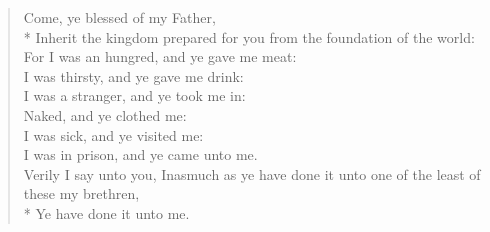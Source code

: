\documentclass[MAIN]{subfiles}
\begin{document}
\begin{verse}
{\color{red} Come, ye blessed of my Father,}\\*
{\color{red} \vin Inherit the kingdom prepared for you from the foundation of the world:}\\
{\color{red} For I was an hungred, and ye gave me meat:}\\
{\color{red} \vin I was thirsty, and ye gave me drink:}\\
{\color{red} I was a stranger, and ye took me in:}\\
{\color{red} \vin Naked, and ye clothed me:}\\
{\color{red} I was sick, and ye visited me:}\\
{\color{red} \vin I was in prison, and ye came unto me.}\\
{\color{red} Verily I say unto you, Inasmuch as ye have done it unto one of the least of these my brethren,}\\*
{\color{red} \vin Ye have done it unto me.}
\end{verse}
\end{document}
